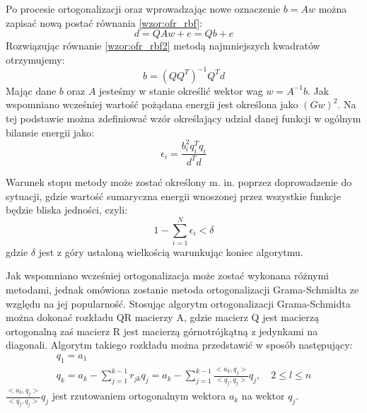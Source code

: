 Po procesie ortogonalizacji oraz wprowadzając nowe oznaczenie $b = Aw$ można zapisać nową postać równania \eqref{wzor:ofr_rbf}:
\begin{equation}
	\label{wzor:ofr_rbf2}
	d = QAw + e = Qb + e
\end{equation}
Rozwiązując równanie \eqref{wzor:ofr_rbf2} metodą najmniejszych kwadratów otrzymujemy:
\begin{equation}
	b = (QQ^T)^{-1}Q^Td
\end{equation}
Mając dane $b$ oraz $A$ jesteśmy w stanie określić wektor wag $w = A^{-1}b$.
Jak wspomniano wcześniej wartość pożądana energii jest określona jako $(Gw)^2$. Na tej podstawie można zdefiniować wzór określający udział danej funkcji w ogólnym bilansie energii jako:
\begin{equation}
	\epsilon_i = \frac{b_i^2q_i^Tq_i}{d^Td}
\end{equation}

Warunek stopu metody może zostać określony m. in. poprzez doprowadzenie do sytuacji, gdzie wartość sumaryczna energii wnoszonej przez wszystkie funkcje będzie bliska jedności, czyli:
\begin{equation}
	1 - \sum_{i=1}^N \epsilon_i < \delta
\end{equation}
gdzie $\delta$ jest z góry ustaloną wielkością warunkując koniec algorytmu.

Jak wspomniano wcześniej ortogonalizacja może zostać wykonana różnymi metodami, jednak omówiona zostanie metoda ortogonalizacji Grama-Schmidta ze względu na jej popularność. Stosując algorytm ortogonalizacji Grama-Schmidta można dokonać rozkładu QR macierzy A, gdzie macierz Q jest macierzą ortogonalną zaś macierz R jest macierzą górnotrójkątną z jedynkami na diagonali. Algorytm takiego rozkładu można przedstawić w sposób następujący\cite{Bernardelli}:
\begin{equation}
	\begin{array}{l}
	q_1 = a_1 \\
	q_k = a_k - \sum_{j=1}^{k-1} r_{jk}q_j = a_k - \sum_{j=1}^{k-1} \frac{<a_k,q_j>}{<q_j,q_j>} q_j, \quad 2 \leq l  \leq n 
\end{array}
\end{equation}
$\frac{<a_k,q_j>}{<q_j,q_j>} q_j$ jest rzutowaniem ortogonalnym wektora $a_k$ na wektor $q_j$.

